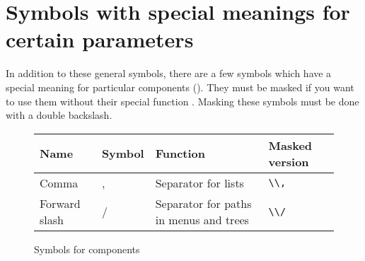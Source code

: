 \section{Symbols with special meanings for certain parameters}
In addition to these general symbols, there are a few symbols which have a special meaning for particular components (). They must be masked if you want to use them without their special function . Masking these symbols must be done with a double backslash. 
\begin{figure}
\begin{tabular}{|l|l|l|l|}\hline
\centering
Name & Symbol & Function & Masked version \\ \hline
Comma & , & Separator for lists & \verb+\\,+\\ \hline
Forward slash & / & Separator for paths in menus and trees & \verb+\\/+\\ \hline
\end{tabular}
\label{specialcompsymbols}
\caption{Symbols for components}
\end{figure}
